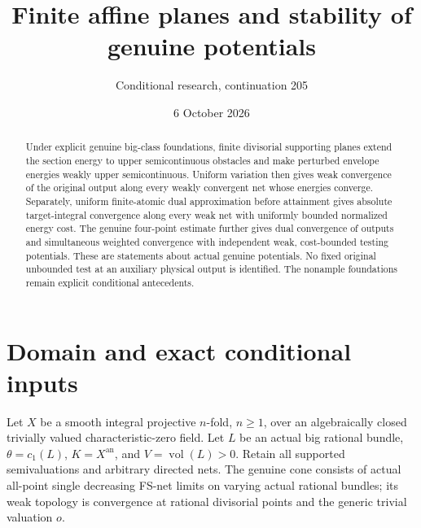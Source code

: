 \documentclass[11pt]{article}
\title{Finite affine planes and stability of genuine potentials}
\author{Conditional research, continuation 205}
\date{6 October 2026}
\newcommand{\vol}{\operatorname{vol}}
\begin{document}
\maketitle
\begin{abstract}
Under explicit genuine big-class foundations, finite divisorial
supporting planes extend the section energy to upper semicontinuous
obstacles and make perturbed envelope energies weakly upper
semicontinuous. Uniform variation then gives weak convergence of
the original output along every weakly convergent net whose energies
converge. Separately, uniform finite-atomic dual approximation before
attainment gives absolute target-integral convergence along every
weak net with uniformly bounded normalized energy cost.
The genuine four-point estimate further gives dual convergence
of outputs and simultaneous weighted convergence with independent
weak, cost-bounded testing potentials.
These are statements about actual genuine potentials. No fixed
original unbounded test at an auxiliary physical output is identified.
The nonample foundations remain explicit conditional antecedents.
\end{abstract}

\section{Domain and exact conditional inputs}
Let $X$ be a smooth integral projective $n$-fold, $n\geq1$, over
an algebraically closed trivially valued characteristic-zero field.
Let $L$ be an actual big rational bundle, $\theta=c_1(L)$,
$K=X^{\mathrm{an}}$, and $V=\vol(L)>0$. Retain all supported
semivaluations and arbitrary directed nets. The genuine cone consists
of actual all-point single decreasing FS-net limits on varying
actual rational bundles; its weak topology is convergence at rational
divisorial points and the generic trivial valuation $o$.
\end{document}
